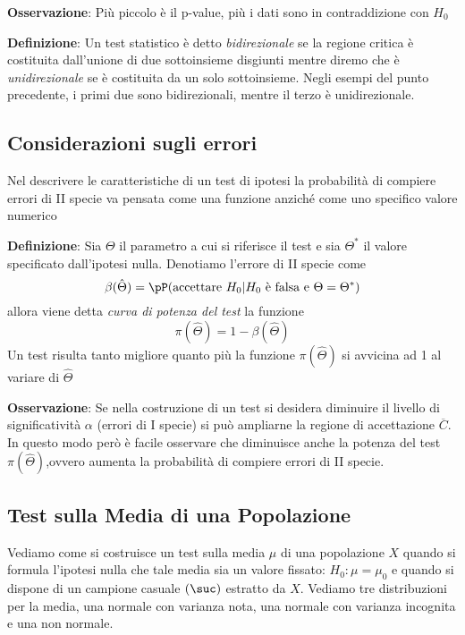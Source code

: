 \ind \textbf{Osservazione}: Più piccolo è il p-value, più i dati sono in contraddizione con $H_0$ \n 

\ind \textbf{Definizione}: Un test statistico è detto \textit{bidirezionale} se la regione critica è costituita dall'unione di due sottoinsieme disgiunti mentre diremo che è \textit{unidirezionale} se è costituita da un solo sottoinsieme. Negli esempi del punto precedente, i primi due sono bidirezionali, mentre il terzo è unidirezionale. \n

\subsection{Considerazioni sugli errori}

Nel descrivere le caratteristiche di un test di ipotesi la probabilità di compiere errori di II specie va pensata come una funzione anziché come uno specifico valore numerico \n

\ind \textbf{Definizione}: Sia $\Theta$ il parametro a cui si riferisce il test e sia $\Theta^*$ il valore specificato dall'ipotesi nulla. Denotiamo l'errore di II specie come $$\beta(\hat{\Theta})=\pP( \text{accettare } H_0 | H_0 \text{ è falsa e } \Theta=\Theta^*)$$ allora viene detta \textit{curva di potenza del test} la funzione $$\pi(\hat{\Theta}) = 1 - \beta(\hat{\Theta})$$ Un test risulta tanto migliore quanto più la funzione $\pi(\hat{\Theta})$ si avvicina ad 1 al variare di $\hat{\Theta}$ \n 

\ind \textbf{Osservazione}: Se nella costruzione di un test si desidera diminuire il livello di significatività $\alpha$ (errori di I specie) si può ampliarne la regione di accettazione $\overline{C}$. In questo modo però è facile osservare che diminuisce anche la potenza del test $\pi(\hat{\Theta})$,ovvero aumenta la probabilità di compiere errori di II specie. \n

\subsection{Test sulla Media di una Popolazione}

Vediamo come si costruisce un test sulla media $\mu$ di una popolazione $X$ quando si formula l’ipotesi nulla che tale media sia un valore fissato: $H_0: \mu = \mu_0$ e quando si dispone di un campione casuale $(\suc)$ estratto da $X$. Vediamo tre distribuzioni per la media, una normale con varianza nota, una normale con varianza incognita e una non normale. \n

